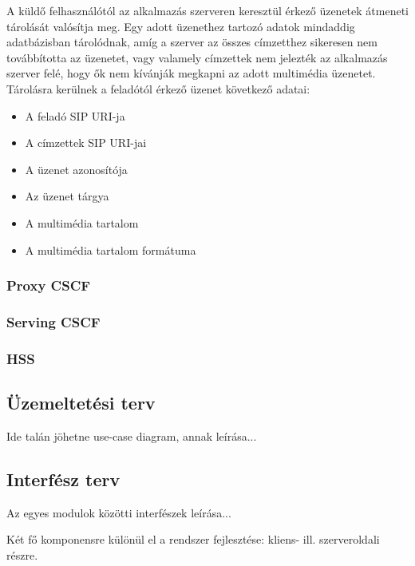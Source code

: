 A küldő felhasználótól az alkalmazás szerveren keresztül érkező üzenetek átmeneti tárolását valósítja meg. Egy adott üzenethez tartozó adatok mindaddig adatbázisban tárolódnak, amíg a szerver az összes címzetthez sikeresen nem továbbította az üzenetet, vagy valamely címzettek nem jelezték az alkalmazás szerver felé, hogy ők nem kívánják megkapni az adott multimédia üzenetet. Tárolásra kerülnek a feladótól érkező üzenet következő adatai:

\begin{itemize}\itemsep1pt
\item	A feladó SIP URI-ja
\item A címzettek SIP URI-jai
\item A üzenet azonosítója
\item Az üzenet tárgya
\item A multimédia tartalom
\item A multimédia tartalom formátuma
\end{itemize}

\subsubsection{Proxy CSCF}
\label{sec:p_cscf}

\subsubsection{Serving CSCF}
\label{sec:s_cscf}

\subsubsection{HSS}
\label{sec:hss}

\subsection{Üzemeltetési terv}
\label{sec:uzemeltetesi_terv}

Ide talán jöhetne use-case diagram, annak leírása...

\subsection{Interfész terv}
\label{sec:interfesz_terv}

Az egyes modulok közötti interfészek leírása...

Két fő komponensre különül el a rendszer fejlesztése: kliens-
ill. szerveroldali részre.

